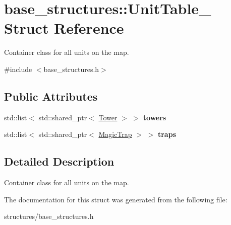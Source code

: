 \hypertarget{structbase__structures_1_1UnitTable__}{}\section{base\+\_\+structures\+:\+:Unit\+Table\+\_\+ Struct Reference}
\label{structbase__structures_1_1UnitTable__}


Container class for all units on the map.  




{\ttfamily \#include $<$base\+\_\+structures.\+h$>$}

\subsection*{Public Attributes}
\begin{DoxyCompactItemize}
\item 
\mbox{\label{structbase__structures_1_1UnitTable___a242e92a698ab2f358281fb06c10190be}} 
std\+::list$<$ std\+::shared\+\_\+ptr$<$ \hyperlink{classbase__structures_1_1Tower}{Tower} $>$ $>$ {\bfseries towers}
\item 
\mbox{\label{structbase__structures_1_1UnitTable___aa14e39e8ff55fa0e1c021099b9ab691b}} 
std\+::list$<$ std\+::shared\+\_\+ptr$<$ \hyperlink{classbase__structures_1_1MagicTrap}{Magic\+Trap} $>$ $>$ {\bfseries traps}
\end{DoxyCompactItemize}


\subsection{Detailed Description}
Container class for all units on the map. 

The documentation for this struct was generated from the following file\+:\begin{DoxyCompactItemize}
\item 
structures/base\+\_\+structures.\+h\end{DoxyCompactItemize}
